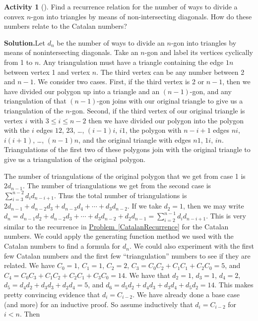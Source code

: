 \documentclass[10pt,]{book}
\theoremstyle{plain}
\theoremstyle{definition}
\newtheorem{activity}[project]{Activity}
\numberwithin{equation}{chapter}
\newcommand{\lt}{<}
\begin{document}
\begin{activity}[]\label{activity-215}
Find a recurrence relation for the number of ways to divide a convex \(n\)-gon into triangles by means of non-intersecting diagonals.  How do these numbers relate to the Catalan numbers?%
\par\medskip\noindent%
\textbf{Solution.}\quad Let \(d_n\) be the number of ways to divide an \(n\)-gon into triangles by means of nonintersecting diagonals. Take an \(n\)-gon and label its vertices cyclically from 1 to \(n\). Any triangulation must have a triangle containing the edge \(1n\) between vertex 1 and vertex \(n\). The third vertex can be any number between 2 and \(n-1\). We consider two cases. First, if the third vertex is 2 or \(n-1\), then we have divided our polygon up into a triangle and an \((n-1)\)-gon, and any triangulation of that \((n-1)\)-gon joins with our original triangle to give us a triangulation of the \(n\)-gon. Second, if the third vertex of our original triangle is vertex \(i\) with \(3\le i\le n-2\) then we have divided our polygon into the polygon with the \(i\) edges \(12\), \(23\), \dots{}, \((i-1)i\), \(i1\), the polygon with \(n-i+1\) edges \(ni\), \(i(i+1)\), \dots{}, \((n-1)n\), and the original triangle with edges \(n1\), \(1i\), \(in\). Triangulations of the first two of these polygons join with the original triangle to give us a triangulation of the original polygon.%
\par
The number of triangulations of the original polygon that we get from case 1 is \(2d_{n-1}\). The number of triangulations we get from the second case is \(\sum_{i=3}^{n-2} d_id_{n-i+1}\). Thus the total number of triangulations is \(2d_{n-1}+d_{n-2}d_3 + d_{n-3}d_4 +\cdots + d_3d_{n-2}\). If we take \(d_2=1\), then we may write \(d_n = d_{n-1}d_2+d_{n-2}d_3 +\cdots+d_3d_{n-2} + d_2d_{n-1}=\sum\limits_{i=2}^{n-1} d_id_{n-i+1}\). This is very similar to the recurrence in \hyperref[CatalanRecurrence]{Problem~\ref{CatalanRecurrence}} for the Catalan numbers. We could apply the generating function method we used with the Catalan numbers to find a formula for \(d_n\). We could also experiment with the first few Catalan numbers and the first few ``triangulation'' numbers to see if they are related. We have \(C_0=1\), \(C_1=1\), \(C_2=2\), \(C_3=C_0C_2+C_1C_1 +C_2C_0=5\), and \(C_4=C_0C_3+C_1C_2+C_2C_1+C_3C_0=14\). We have that \(d_2=1\), \(d_3=1\), \(d_4=2\), \(d_5=d_4d_2+d_3d_3+d_2d_4=5\), and \(d_6=d_5d_2+d_4d_3+d_3d_4+d_5d_2=14\). This makes pretty convincing evidence that \(d_i= C_{i-2}\). We have already done a base case (and more) for an inductive proof. So assume inductively that \(d_{i}=C_{i-2}\) for \(i\lt n\). Then%

\end{activity}
\end{document}
